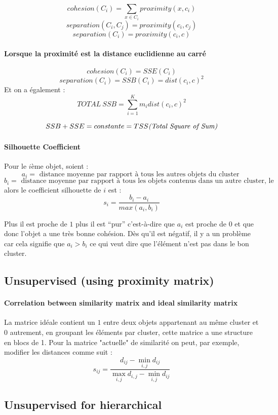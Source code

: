 \documentclass{article}
\begin{document}
\begin{sffamily}
$$cohesion(C_i) = \sum_{x\in C_i} proximity(x,c_i)$$
$$separation(C_i,C_j) = proximity(c_i,c_j)$$
$$separation(C_i) = proximity(c_i,c)$$

\paragraph{Lorsque la proximité est la distance euclidienne au carré}

$$cohesion(C_i) = SSE(C_i)$$
$$separation(C_i) = SSB(C_i) = dist(c_i,c)^2$$
Et on a également : $$TOTAL\ SSB = \sum_{i=1}^K m_i dist(c_i,c)^2 $$

$$SSB+SSE = constante = TSS \text{\textit{(Total Square of Sum)}}$$

\paragraph{Silhouette Coefficient}

Pour le $i$ème objet, soient : $$a_i = \text{ distance moyenne par rapport à tous les autres objets du cluster }$$
$$b_i = \text{ distance moyenne par rapport à tous les objets contenus dans un autre cluster, le cluster le plus proche }$$
alors le coefficient silhouette de $i$ est : $$s_i = \frac{b_i-a_i}{max(a_i,b_i)}$$

Plus il est proche de $1$ plus il est ``pur'' c'est-à-dire que $a_i$ est proche de $0$ et que donc l'objet a une très bonne cohésion. Dès 
qu'il est négatif, il y a un problème car cela signifie que $a_i > b_i$ ce qui veut dire que l'élément n'est pas dans le bon cluster.

\subsection{Unsupervised (using proximity matrix)}

\paragraph{Correlation between similarity matrix and ideal similarity matrix}

La matrice idéale contient un $1$ entre deux objets appartenant au même cluster et $0$ autrement, en groupant les éléments par cluster,
cette matrice a une structure en blocs de 1. Pour la matrice "actuelle" de similarité on peut, par exemple, modifier les distances comme 
suit : $$ s_{ij} = \dfrac{d_{ij}-\min_{i,j}d_{ij}} {\max_{i,j}d_{i,j} - \min_{i,j}d_{ij}}$$

\subsection{Unsupervised for hierarchical}


\end{sffamily}
\end{document}
